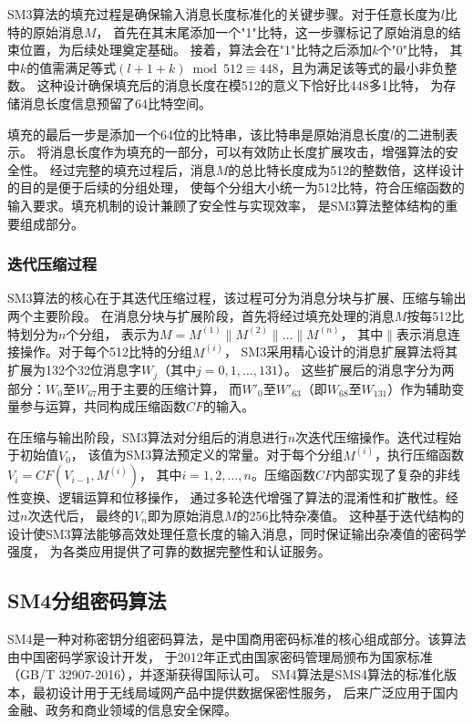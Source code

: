 SM3算法的填充过程是确保输入消息长度标准化的关键步骤。对于任意长度为$l$比特的原始消息$M$，
首先在其末尾添加一个"1"比特，这一步骤标记了原始消息的结束位置，为后续处理奠定基础。
接着，算法会在"1"比特之后添加$k$个"0"比特，
其中$k$的值需满足等式$(l + 1 + k) \bmod 512 \equiv 448$，且为满足该等式的最小非负整数。
这种设计确保填充后的消息长度在模512的意义下恰好比448多1比特，
为存储消息长度信息预留了64比特空间。

填充的最后一步是添加一个64位的比特串，该比特串是原始消息长度$l$的二进制表示。
将消息长度作为填充的一部分，可以有效防止长度扩展攻击，增强算法的安全性。
经过完整的填充过程后，消息$M$的总比特长度成为512的整数倍，这样设计的目的是便于后续的分组处理，
使每个分组大小统一为512比特，符合压缩函数的输入要求。填充机制的设计兼顾了安全性与实现效率，
是SM3算法整体结构的重要组成部分。

\subsubsection{迭代压缩过程}

SM3算法的核心在于其迭代压缩过程，该过程可分为消息分块与扩展、压缩与输出两个主要阶段。
在消息分块与扩展阶段，首先将经过填充处理的消息$M$按每512比特划分为$n$个分组，
表示为$M = M^{(1)} \parallel M^{(2)} \parallel \ldots \parallel M^{(n)}$，
其中$\parallel$表示消息连接操作。对于每个512比特的分组$M^{(i)}$，
SM3采用精心设计的消息扩展算法将其扩展为132个32位消息字$W_j$（其中$j=0,1,\ldots,131$）。
这些扩展后的消息字分为两部分：$W_0$至$W_{67}$用于主要的压缩计算，
而$W'_0$至$W'_{63}$（即$W_{68}$至$W_{131}$）作为辅助变量参与运算，共同构成压缩函数$CF$的输入。

在压缩与输出阶段，SM3算法对分组后的消息进行$n$次迭代压缩操作。迭代过程始于初始值$V_0$，
该值为SM3算法预定义的常量。对于每个分组$M^{(i)}$，执行压缩函数$V_i = CF(V_{i-1}, M^{(i)})$，
其中$i = 1,2,\ldots,n$。压缩函数$CF$内部实现了复杂的非线性变换、逻辑运算和位移操作，
通过多轮迭代增强了算法的混淆性和扩散性。经过$n$次迭代后，
最终的$V_n$即为原始消息$M$的256比特杂凑值。
这种基于迭代结构的设计使SM3算法能够高效处理任意长度的输入消息，同时保证输出杂凑值的密码学强度，
为各类应用提供了可靠的数据完整性和认证服务。

\subsection{SM4分组密码算法}

SM4是一种对称密钥分组密码算法，是中国商用密码标准的核心组成部分。该算法由中国密码学家设计开发，
于2012年正式由国家密码管理局颁布为国家标准（GB/T 32907-2016），并逐渐获得国际认可。
SM4算法是SMS4算法的标准化版本，最初设计用于无线局域网产品中提供数据保密性服务，
后来广泛应用于国内金融、政务和商业领域的信息安全保障。

